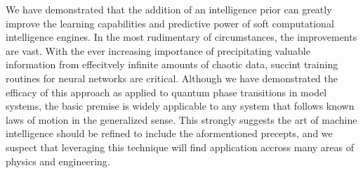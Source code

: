 We have demonstrated that the addition of an intelligence prior can greatly
improve the learning capabilities and predictive power of soft computational
intelligence engines. In the most rudimentary of circumstances, the
improvements are vast. With the ever increasing importance of precipitating
valuable information from effecitvely infinite amounts of chaotic data, succint
training routines for neural networks are critical. Although we have
demonstrated the efficacy of this approach as applied to quantum phase
transitions in model systems, the basic premise is widely applicable to any
system that follows known laws of motion in the generalized sense. This
strongly suggests the art of machine intelligence should be refined to include
the aformentioned precepts, and we suspect that leveraging this technique will
find application accross many areas of physics and engineering. 
